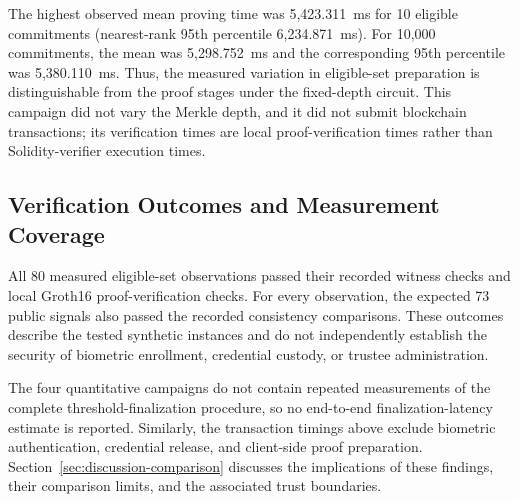 The highest observed mean proving time was 5,423.311~ms for 10 eligible commitments (nearest-rank 95th percentile 6,234.871~ms). For 10,000 commitments, the mean was 5,298.752~ms and the corresponding 95th percentile was 5,380.110~ms. Thus, the measured variation in eligible-set preparation is distinguishable from the proof stages under the fixed-depth circuit. This campaign did not vary the Merkle depth, and it did not submit blockchain transactions; its verification times are local proof-verification times rather than Solidity-verifier execution times.

\subsection{Verification Outcomes and Measurement Coverage}
\label{subsec:results-verification}

All 80 measured eligible-set observations passed their recorded witness checks and local Groth16 proof-verification checks. For every observation, the expected 73 public signals also passed the recorded consistency comparisons. These outcomes describe the tested synthetic instances and do not independently establish the security of biometric enrollment, credential custody, or trustee administration.

The four quantitative campaigns do not contain repeated measurements of the complete threshold-finalization procedure, so no end-to-end finalization-latency estimate is reported. Similarly, the transaction timings above exclude biometric authentication, credential release, and client-side proof preparation. Section~\ref{sec:discussion-comparison} discusses the implications of these findings, their comparison limits, and the associated trust boundaries.
